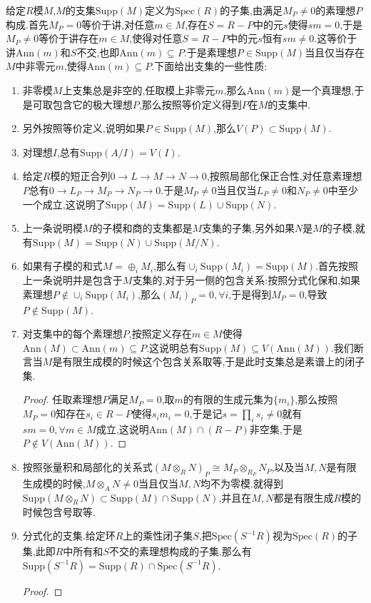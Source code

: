 给定$R$模$M$,$M$的支集$\mathrm{Supp}(M)$定义为$\mathrm{Spec}(R)$的子集,由满足$M_P\not=0$的素理想$P$构成.首先$M_P=0$等价于讲,对任意$m\in M$,存在$S=R-P$中的元$s$使得$sm=0$,于是$M_P\not=0$等价于讲存在$m\in M$,使得对任意$S=R-P$中的元$s$恒有$sm\not=0$.这等价于讲$\mathrm{Ann}(m)$和$S$不交,也即$\mathrm{Ann}(m)\subseteq P$.于是素理想$P\in\mathrm{Supp}(M)$当且仅当存在$M$中非零元$m$,使得$\mathrm{Ann}(m)\subseteq P$.下面给出支集的一些性质:
\begin{enumerate}
	\item 非零模$M$上支集总是非空的,任取模上非零元$m$,那么$\mathrm{Ann}(m)$是一个真理想,于是可取包含它的极大理想$P$,那么按照等价定义得到$P$在$M$的支集中.
	\item 另外按照等价定义,说明如果$P\in\mathrm{Supp}(M)$,那么$V(P)\subset\mathrm{Supp}(M)$.
	\item 对理想$I$,总有$\mathrm{Supp}(A/I)=V(I)$.
	\item 给定$R$模的短正合列$0\to L\to M\to N\to0$,按照局部化保正合性,对任意素理想$P$总有$0\to L_P\to M_P\to N_P\to0$.于是$M_P\not=0$当且仅当$L_P\not=0$和$N_P\not=0$中至少一个成立,这说明了$\mathrm{Supp}(M)=\mathrm{Supp}(L)\cup\mathrm{Supp}(N)$.
	\item 上一条说明模$M$的子模和商的支集都是$M$支集的子集,另外如果$N$是$M$的子模,就有$\mathrm{Supp}(M)=\mathrm{Supp}(N)\cup\mathrm{Supp}(M/N)$.
	\item 如果有子模的和式$M=\oplus_iM_i$,那么有$\cup_i\mathrm{Supp}(M_i)=\mathrm{Supp}(M)$.首先按照上一条说明并是包含于$M$支集的,对于另一侧的包含关系:按照分式化保和,如果素理想$P\not\in\cup_i\mathrm{Supp}(M_i)$,那么$(M_i)_P=0,\forall i$,于是得到$M_P=0$,导致$P\not\in\mathrm{Supp}(M)$.
	\item 对支集中的每个素理想$P$,按照定义存在$m\in M$使得$\mathrm{Ann}(M)\subset\mathrm{Ann}(m)\subseteq P$.这说明总有$\mathrm{Supp}(M)\subseteq V(\mathrm{Ann}(M))$.我们断言当$M$是有限生成模的时候这个包含关系取等,于是此时支集总是素谱上的闭子集.
	\begin{proof}
		
		任取素理想$P$满足$M_P=0$,取$m$的有限的生成元集为$\{m_i\}$,那么按照$M_P=0$知存在$s_i\in R-P$使得$s_im_i=0$,于是记$s=\prod_is_i\not=0$就有$sm=0,\forall m\in M$成立,这说明$\mathrm{Ann}(M)\cap(R-P)$非空集,于是$P\not\in V(\mathrm{Ann}(M))$.
	\end{proof}
	\item 按照张量积和局部化的关系式$(M\otimes_RN)_P\cong M_P\otimes_{R_P}N_P$,以及当$M,N$是有限生成模的时候,$M\otimes_AN\not=0$当且仅当$M,N$均不为零模.就得到$\mathrm{Supp}(M\otimes_RN)\subset\mathrm{Supp}(M)\cap\mathrm{Supp}(N)$,并且在$M,N$都是有限生成$R$模的时候包含号取等.
	\item 分式化的支集.给定环$R$上的乘性闭子集$S$,把$\mathrm{Spec}(S^{-1}R)$视为$\mathrm{Spec}(R)$的子集,此即$R$中所有和$S$不交的素理想构成的子集.那么有$\mathrm{Supp}(S^{-1}R)=\mathrm{Supp}(R)\cap\mathrm{Spec}(S^{-1}R)$.
	\begin{proof}
		

\end{proof}
\end{enumerate}
